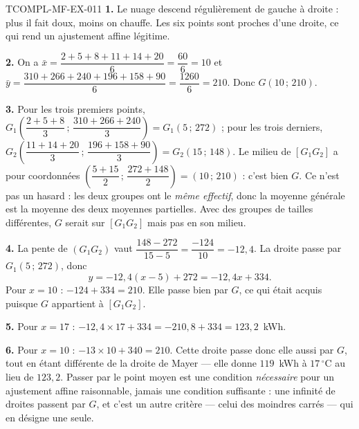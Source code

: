 \begin{corrige}{TCOMPL-MF-EX-011}
\textbf{1.} Le nuage descend régulièrement de gauche à droite : plus il fait
doux, moins on chauffe. Les six points sont proches d'une droite, ce qui rend
un ajustement affine légitime.

\textbf{2.} On a $\bar x=\dfrac{2+5+8+11+14+20}{6}=\dfrac{60}{6}=10$ et
$\bar y=\dfrac{310+266+240+196+158+90}{6}=\dfrac{1260}{6}=210$. Donc
$G(10\,;\,210)$.

\textbf{3.} Pour les trois premiers points,
$G_1\left(\dfrac{2+5+8}{3}\,;\,\dfrac{310+266+240}{3}\right)=G_1(5\,;\,272)$ ; pour
les trois derniers, $G_2\left(\dfrac{11+14+20}{3}\,;\,\dfrac{196+158+90}{3}\right)=G_2(15\,;\,148)$.
Le milieu de $[G_1G_2]$ a pour coordonnées
$\left(\dfrac{5+15}{2}\,;\,\dfrac{272+148}{2}\right)=(10\,;\,210)$ : c'est bien $G$.
Ce n'est pas un hasard : les deux groupes ont le \emph{même effectif}, donc la
moyenne générale est la moyenne des deux moyennes partielles. Avec des groupes
de tailles différentes, $G$ serait sur $[G_1G_2]$ mais pas en son milieu.

\textbf{4.} La pente de $(G_1G_2)$ vaut
$\dfrac{148-272}{15-5}=\dfrac{-124}{10}=-12{,}4$. La droite passe par
$G_1(5\,;\,272)$, donc
\[
  y=-12{,}4(x-5)+272=-12{,}4x+334.
\]
Pour $x=10$ : $-124+334=210$. Elle passe bien par $G$, ce qui était acquis
puisque $G$ appartient à $[G_1G_2]$.

\textbf{5.} Pour $x=17$ : $-12{,}4\times 17+334=-210{,}8+334=123{,}2$~kWh.

\textbf{6.} Pour $x=10$ : $-13\times 10+340=210$. Cette droite passe donc elle
aussi par $G$, tout en étant différente de la droite de Mayer — elle donne
$119$~kWh à $17\,^\circ$C au lieu de $123{,}2$. Passer par le point moyen est une
condition \emph{nécessaire} pour un ajustement affine raisonnable, jamais une
condition suffisante : une infinité de droites passent par $G$, et c'est un
autre critère — celui des moindres carrés — qui en désigne une seule.
\end{corrige}
